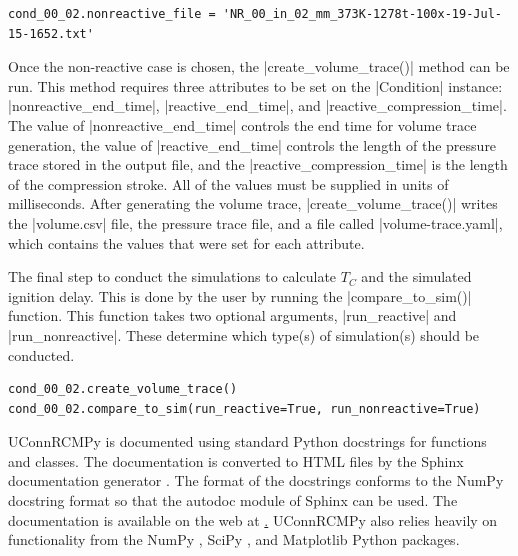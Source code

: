 \documentclass[12pt]{../ussci}
\begin{document}
\begin{verbatim}
cond_00_02.nonreactive_file = 'NR_00_in_02_mm_373K-1278t-100x-19-Jul-15-1652.txt'
\end{verbatim}

Once the non-reactive case is chosen, the \python|create_volume_trace()| method
can be run. This method requires three attributes to be set on the
\python|Condition| instance: \python|nonreactive_end_time|,
\python|reactive_end_time|, and \python|reactive_compression_time|. The value of
\python|nonreactive_end_time| controls the end time for volume trace generation,
the value of \python|reactive_end_time| controls the length of the pressure
trace stored in the output file, and the \python|reactive_compression_time| is
the length of the compression stroke. All of the values must be supplied in
units of milliseconds. After generating the volume trace,
\python|create_volume_trace()| writes the \python|volume.csv| file, the pressure
trace file, and a file called \python|volume-trace.yaml|, which contains the
values that were set for each attribute.

The final step to conduct the simulations to calculate \(T_C\) and the simulated
ignition delay. This is done by the user by running the
\python|compare_to_sim()| function. This function takes two optional arguments,
\python|run_reactive| and \python|run_nonreactive|. These determine which
type(s) of simulation(s) should be conducted.

\begin{verbatim}
cond_00_02.create_volume_trace()
cond_00_02.compare_to_sim(run_reactive=True, run_nonreactive=True)
\end{verbatim}


UConnRCMPy is documented using standard Python docstrings for functions and
classes. The documentation is converted to HTML files by the Sphinx
documentation generator \autocite{Brandl2016}. The format of the docstrings
conforms to the NumPy docstring format so that the autodoc module of Sphinx can
be used. The documentation is available on the web at
\href{https://bryanwweber.github.io/UConnRCMPy/}. UConnRCMPy also relies heavily
on functionality from the NumPy \autocite{vanderWalt2011}, SciPy
\autocite{Jones2001}, and Matplotlib \autocite{Hunter2007} Python packages.
\end{document}
